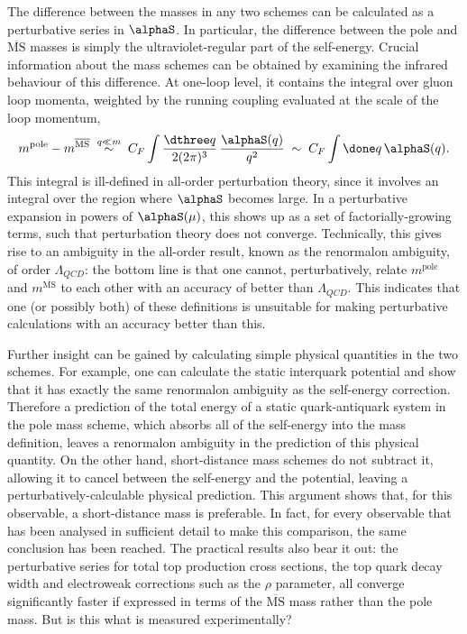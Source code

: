 The difference between the masses in any two schemes can be calculated
as a perturbative series in $\alphaS$.  In particular, the difference
between the pole and $\overline{\mathrm{MS}}$ masses is simply the
ultraviolet-regular part of the self-energy.  Crucial
information about the mass schemes can be obtained by examining the
infrared behaviour of this difference.  At one-loop level, it contains
the integral over gluon loop momenta, weighted by the running coupling
evaluated at the scale of the loop momentum,
\begin{equation}
  \label{eq:C6}
  m^{\mathrm{pole}}-m^{\overline{\mathrm{MS}}}
  \;\stackrel{q\ll m}\sim\;
  C_F\int \frac{\dthree q}{2(2\pi)^3}\,\frac{\alphaS(q)}{q^2}
  \;\sim\; C_F\int \done q\,\alphaS(q).
\end{equation}
This integral is ill-defined in all-order perturbation theory, since it
involves an integral over the region where $\alphaS$ becomes large.
In a perturbative
expansion in powers of $\alphaS(\mu)$, this shows up as a set of
factorially-growing terms, such that perturbation theory does not
converge.  Technically, this gives rise to an ambiguity in the all-order
result, known as the renormalon ambiguity, of
order $\Lambda_{QCD}$: the bottom line is that one cannot,
perturbatively, relate $m^{\mathrm{pole}}$ and
$m^{\overline{\mathrm{MS}}}$ to each other with an accuracy of better
than $\Lambda_{QCD}$.  This indicates that one (or possibly both) of
these definitions is unsuitable for making perturbative calculations
with an accuracy better than this.

Further insight can be gained by calculating simple physical quantities
in the two schemes.  For example, one can calculate the static
interquark potential and show that it has exactly the same renormalon
ambiguity as the self-energy correction.  Therefore a prediction of the
total energy of a static quark-antiquark system in the pole mass scheme,
which absorbs all of the self-energy into the mass definition, leaves a
renormalon ambiguity in the prediction of this physical quantity.  On
the other hand, short-distance mass schemes do not subtract it,
allowing it to cancel between the self-energy and the potential, leaving
a perturbatively-calculable physical prediction.  This argument shows
that, for this observable, a short-distance mass is preferable.  In
fact, for every
observable that has been analysed in sufficient detail to make this
comparison, the same conclusion has been reached.  The practical results
also bear it out: the perturbative series for total top production
cross sections, the top quark decay width and electroweak corrections
such as the $\rho$ parameter, all converge significantly faster if
expressed in terms of the $\overline{\mathrm{MS}}$ mass rather than the
pole mass.  But is this what is measured experimentally?

